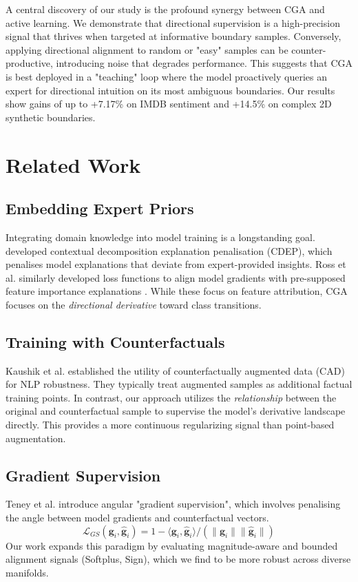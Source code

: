 \documentclass[sigconf,anonymous]{aamas}
\begin{document}
A central discovery of our study is the profound synergy between CGA and active learning. We demonstrate that directional supervision is a high-precision signal that thrives when targeted at informative boundary samples. Conversely, applying directional alignment to random or "easy" samples can be counter-productive, introducing noise that degrades performance. This suggests that CGA is best deployed in a "teaching" loop where the model proactively queries an expert for directional intuition on its most ambiguous boundaries. Our results show gains of up to +7.17\% on IMDB sentiment and +14.5\% on complex 2D synthetic boundaries.

\section{Related Work}
\label{related_work}

\subsection{Embedding Expert Priors}
Integrating domain knowledge into model training is a longstanding goal. \citeauthor{rieger2020interpretations} \cite{rieger2020interpretations} developed contextual decomposition explanation penalisation (CDEP), which penalises model explanations that deviate from expert-provided insights. Ross et al. similarly developed loss functions to align model gradients with pre-supposed feature importance explanations \cite{ross2017right}. While these focus on feature attribution, CGA focuses on the \emph{directional derivative} toward class transitions.

\subsection{Training with Counterfactuals}
Kaushik et al. \cite{Kaushik2020Learning} established the utility of counterfactually augmented data (CAD) for NLP robustness. They typically treat augmented samples as additional factual training points. In contrast, our approach utilizes the \emph{relationship} between the original and counterfactual sample to supervise the model's derivative landscape directly. This provides a more continuous regularizing signal than point-based augmentation.

\subsection{Gradient Supervision}
\label{subsec:gradient_supervision_related}
Teney et al. \cite{teney2020learning} introduce angular "gradient supervision", which involves penalising the angle between model gradients and counterfactual vectors. 
\begin{equation}
        \mathcal{L}_{GS} \left(\mathbf{g}_i,\hat{\mathbf{g}}_i \right)  = 
        1 - \langle\mathbf{g}_i,\hat{\mathbf{g}}_i \rangle /
        \left( \lVert \mathbf{g}_i \rVert \lVert \hat{\mathbf{g}}_i \rVert \right)
\end{equation}
Our work expands this paradigm by evaluating magnitude-aware and bounded alignment signals (Softplus, Sign), which we find to be more robust across diverse manifolds.
\end{document}
